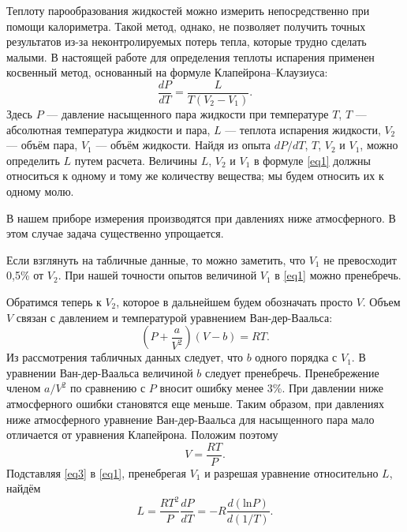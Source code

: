 \documentclass[a4paper, 12pt]{article}
\begin{document}
    Теплоту парообразования жидкостей можно измерить непосредственно при помощи калориметра. Такой метод, однако, не позволяет получить точных результатов из-за неконтролируемых потерь тепла, которые трудно сделать малыми. В настоящей работе для определения теплоты испарения применен косвенный метод, основанный на формуле Клапейрона–Клаузиуса:
    \begin{equation}
        \frac{dP}{dT} = \frac{L}{T (V_2 - V_1)}.
        \label{eq1}
    \end{equation}
    Здесь $P$ — давление насыщенного пара жидкости при температуре $T$, $T$ — абсолютная температура жидкости и пара, $L$ — теплота испарения жидкости, $V_2$ — объём пара, $V_1$ — объём жидкости. Найдя из опыта $dP/dT$, $T$, $V_2$ и $V_1$, можно определить $L$ путем расчета. Величины $L$, $V_2$ и $V_1$ в формуле \eqref{eq1} должны относиться к одному и тому же количеству вещества; мы будем относить их к одному молю.
    
    В нашем приборе измерения производятся при давлениях ниже атмосферного. В этом случае задача существенно упрощается.
    
    Если взглянуть на табличные данные, то можно заметить, что $V_1$ не превосходит 0,5\% от $V_2$. При нашей точности опытов величиной $V_1$ в \eqref{eq1} можно пренебречь.
    
    Обратимся теперь к $V_2$, которое в дальнейшем будем обозначать просто $V$. Объем $V$ связан с давлением и температурой уравнением Ван-дер-Ваальса:
    \begin{equation}
        \left( P + \frac{a}{V^2} \right) (V - b) = RT.
        \label{eq2}
    \end{equation}
    Из рассмотрения табличных данных следует, что $b$ одного порядка с $V_1$. В уравнении Ван-дер-Ваальса величиной $b$ следует пренебречь. Пренебрежение членом $a/V^2$ по сравнению с $P$ вносит ошибку менее 3\%. При давлении ниже атмосферного ошибки становятся еще меньше. Таким образом, при давлениях ниже атмосферного уравнение Ван-дер-Ваальса для насыщенного пара мало отличается от уравнения Клапейрона. Положим поэтому
    \begin{equation}
        V = \frac{RT}{P}.
        \label{eq3}
    \end{equation}
    Подставляя \eqref{eq3} в \eqref{eq1}, пренебрегая $V_1$ и разрешая уравнение относительно $L$, найдём
    \begin{equation}
        L = \frac{R T^2}{P} \frac{dP}{dT} = -R \frac{d(\text{ln}P)}{d(1/T)}.
        \label{eq4}
    \end{equation}
    
\end{document}
